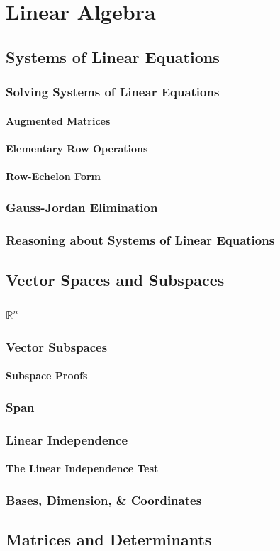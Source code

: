 \documentclass[10pt]{book}
\begin{document}
\part{Linear Algebra}

\chapter{Systems of Linear Equations}
\section{Solving Systems of Linear Equations}
\subsection{Augmented Matrices}
\subsection{Elementary Row Operations}
\subsection{Row-Echelon Form}
\section{Gauss-Jordan Elimination}
\section{Reasoning about Systems of Linear Equations}

\chapter{Vector Spaces and Subspaces}
\section{$\mathbb{R}^n$}
\section{Vector Subspaces}
\subsection{Subspace Proofs}
\section{Span}
\section{Linear Independence}
\subsection{The Linear Independence Test}
\section{Bases, Dimension, \& Coordinates}

\chapter{Matrices and Determinants}
\end{document}

